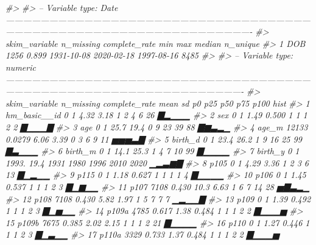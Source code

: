 \documentclass[]{article}
\newenvironment{Shaded}{\begin{snugshade}}{\end{snugshade}}
\newcommand{\CommentTok}[1]{\textcolor[rgb]{0.56,0.35,0.01}{\textit{#1}}}
\begin{document}
\begin{Shaded}
\begin{Highlighting}[]
\CommentTok{#> }
\CommentTok{#> -- Variable type: Date ----------------------------------------------------------------------------------------------------------------------------------------------------------------------------------------------}
\CommentTok{#>   skim_variable n_missing complete_rate min        max        median     n_unique}
\CommentTok{#> 1 DOB                1256         0.899 1931-10-08 2020-02-18 1997-08-16     8485}
\CommentTok{#> }
\CommentTok{#> -- Variable type: numeric -------------------------------------------------------------------------------------------------------------------------------------------------------------------------------------------}
\CommentTok{#>    skim_variable    n_missing complete_rate    mean       sd   p0  p25  p50  p75 p100 hist }
\CommentTok{#>  1 hm_basic__id             0        1         4.32    3.18     1    2    4    6   26 ▇▂▁▁▁}
\CommentTok{#>  2 sex                      0        1         1.49    0.500    1    1    1    2    2 ▇▁▁▁▇}
\CommentTok{#>  3 age                      0        1        25.7    19.4      0    9   23   39   88 ▇▆▃▂▁}
\CommentTok{#>  4 age_m                12133        0.0279    6.06    3.39     0    3    6    9   11 ▅▅▅▃▇}
\CommentTok{#>  5 birth_d                  0        1        23.4    26.2      1    9   16   25   99 ▇▃▁▁▁}
\CommentTok{#>  6 birth_m                  0        1        14.1    25.3      1    4    7   10   99 ▇▁▁▁▁}
\CommentTok{#>  7 birth_y                  0        1      1993.     19.4   1931 1980 1996 2010 2020 ▁▂▃▆▇}
\CommentTok{#>  8 p105                     0        1         4.29    3.36     1    2    3    6   13 ▇▁▂▁▁}
\CommentTok{#>  9 p115                     0        1         1.18    0.627    1    1    1    1    4 ▇▁▁▁▁}
\CommentTok{#> 10 p106                     0        1         1.45    0.537    1    1    1    2    3 ▇▁▆▁▁}
\CommentTok{#> 11 p107                  7108        0.430    10.3     6.63     1    6    7   14   28 ▅▇▃▂▁}
\CommentTok{#> 12 p108                  7108        0.430     5.82    1.97     1    5    7    7    7 ▁▂▁▁▇}
\CommentTok{#> 13 p109                     0        1         1.39    0.492    1    1    1    2    3 ▇▁▅▁▁}
\CommentTok{#> 14 p109a                 4785        0.617     1.38    0.484    1    1    1    2    2 ▇▁▁▁▅}
\CommentTok{#> 15 p109b                 7675        0.385     2.02    2.15     1    1    1    2   21 ▇▁▁▁▁}
\CommentTok{#> 16 p110                     0        1         1.27    0.446    1    1    1    2    3 ▇▁▃▁▁}
\CommentTok{#> 17 p110a                 3329        0.733     1.37    0.484    1    1    1    2    2 ▇▁▁▁▅}

\end{Highlighting}
\end{Shaded}
\end{document}
